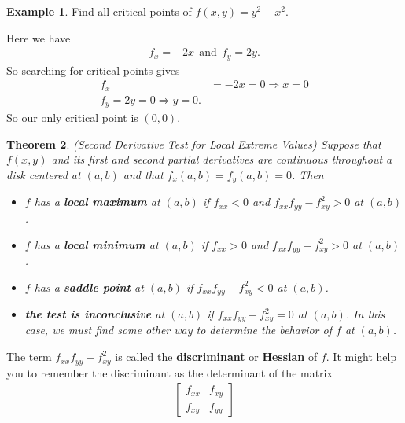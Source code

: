 \documentclass[12pt, letter]{article}
\theoremstyle{plain}
\newtheorem{theorem}{Theorem}
\numberwithin{theorem}{section}
\theoremstyle{definition}
\newtheorem{example}[theorem]{Example}
\begin{document}
\bigskip

\hrulefill

\bigskip

\begin{example}
Find all critical points of $f(x,y) = y^2-x^2$.

\smallskip

Here we have
\begin{align*}
f_x = -2x \ \ \text{and} \ \ f_y = 2y.
\end{align*}
So searching for critical points gives
\begin{align*}
f_x &= -2x = 0 \Rightarrow x=0\\
f_y = 2y =0 \Rightarrow y=0.
\end{align*}
So our only critical point is $(0,0)$.
\end{example}

\bigskip

\hrulefill

\bigskip

\begin{theorem}{(Second Derivative Test for Local Extreme Values)}
Suppose that $f(x,y)$ and its first and second partial derivatives are continuous throughout a disk centered at $(a,b)$ and that $f_x(a,b) = f_y(a,b)=0$. Then
\begin{itemize}
\item[1.] $f$ has a \textbf{local maximum} at $(a,b)$ if $f_{xx} <0$ and $f_{xx}f_{yy}-f_{xy}^2>0$ at $(a,b)$.
\item[2.] $f$ has a \textbf{local minimum} at $(a,b)$ if $f_{xx} >0$ and $f_{xx}f_{yy}-f_{xy}^2>0$ at $(a,b)$.
\item[3.] $f$ has a \textbf{saddle point} at $(a,b)$ if $f_{xx}f_{yy}-f_{xy}^2<0$ at $(a,b)$.
\item[4.] \textbf{the test is inconclusive} at $(a,b)$ if $f_{xx}f_{yy} - f_{xy}^2=0$ at $(a,b)$. In this case, we must find some other way to determine the behavior of $f$ at $(a,b)$.
\end{itemize}
\end{theorem}

\bigskip

The term $f_{xx}f_{yy}-f_{xy}^2$ is called the \textbf{discriminant} or \textbf{Hessian} of $f$. It might help you to remember the discriminant as the determinant of the matrix
\begin{align*}
\begin{bmatrix} f_{xx} & f_{xy} \\ f_{xy} & f_{yy} \end{bmatrix}
\end{align*}
\end{document}
